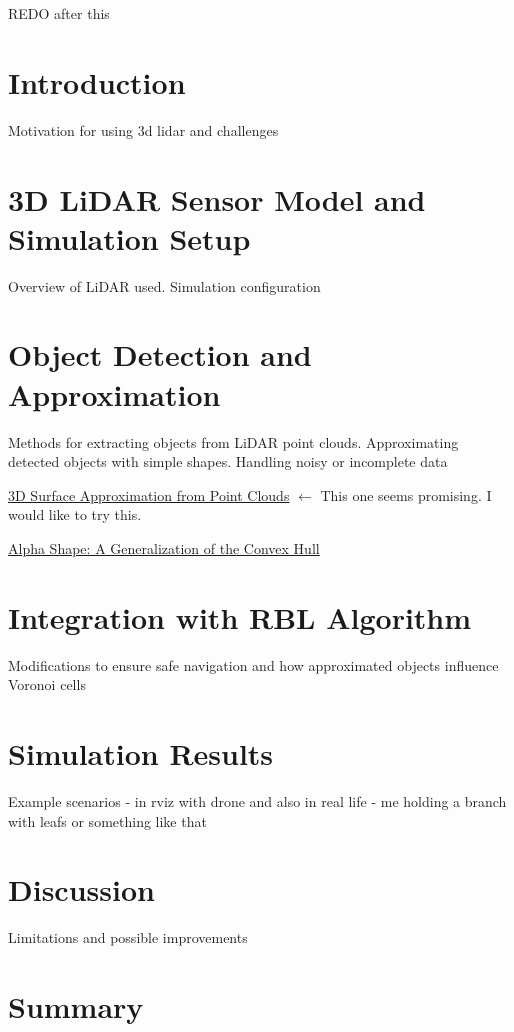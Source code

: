 REDO after this

\section{Introduction}

Motivation for using 3d lidar and challenges

\section{3D LiDAR Sensor Model and Simulation Setup}

Overview of LiDAR used. Simulation configuration

\section{Object Detection and Approximation}

Methods for extracting objects from LiDAR point clouds. Approximating detected objects with simple shapes. Handling noisy or incomplete data


\href{https://groups.inf.ed.ac.uk/advr/papers/3D_Surface_Approximation_from_Point_Clouds.pdf}{3D Surface Approximation from Point Clouds} $\leftarrow$ This one seems promising. I would like to try this.


\href{https://en.wikipedia.org/wiki/Alpha_shape}{Alpha Shape: A Generalization of the Convex Hull}



\section{Integration with RBL Algorithm}

Modifications to ensure safe navigation and how approximated objects influence Voronoi cells

\section{Simulation Results}

Example scenarios - in rviz with drone and also in real life - me holding a branch with leafs or something like that

\section{Discussion}

Limitations and possible improvements

\section{Summary}